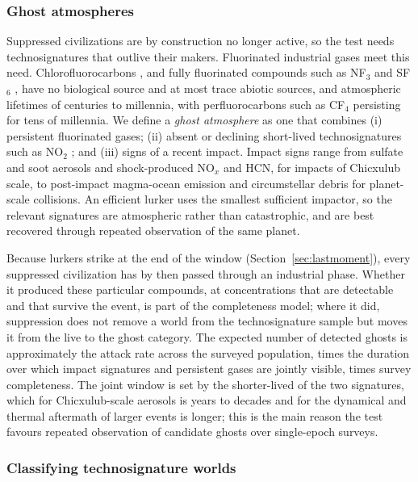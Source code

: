 \documentclass[preprint,12pt]{elsarticle}
\theoremstyle{definition}
\begin{document}
\subsubsection{Ghost atmospheres}

Suppressed civilizations are by construction no longer active, so the test needs technosignatures that outlive their makers. Fluorinated industrial gases meet this need. Chlorofluorocarbons \citep{Lin2014,HaqqMisra2022}, and fully fluorinated compounds such as NF$_3$ and SF$_6$ \citep{Seager2023}, have no biological source and at most trace abiotic sources, and atmospheric lifetimes of centuries to millennia, with perfluorocarbons such as CF$_4$ persisting for tens of millennia. We define a \emph{ghost atmosphere} as one that combines (i) persistent fluorinated gases; (ii) absent or declining short-lived technosignatures such as NO$_2$ \citep{Kopparapu2021}; and (iii) signs of a recent impact. Impact signs range from sulfate and soot aerosols and shock-produced NO$_x$ and HCN, for impacts of Chicxulub scale, to post-impact magma-ocean emission \citep{Lupu2014} and circumstellar debris \citep{Kenworthy2023} for planet-scale collisions. An efficient lurker uses the smallest sufficient impactor, so the relevant signatures are atmospheric rather than catastrophic, and are best recovered through repeated observation of the same planet.

Because lurkers strike at the end of the window (Section~\ref{sec:lastmoment}), every suppressed civilization has by then passed through an industrial phase. Whether it produced these particular compounds, at concentrations that are detectable and that survive the event, is part of the completeness model; where it did, suppression does not remove a world from the technosignature sample but moves it from the live to the ghost category. The expected number of detected ghosts is approximately the attack rate across the surveyed population, times the duration over which impact signatures and persistent gases are jointly visible, times survey completeness. The joint window is set by the shorter-lived of the two signatures, which for Chicxulub-scale aerosols is years to decades and for the dynamical and thermal aftermath of larger events is longer; this is the main reason the test favours repeated observation of candidate ghosts over single-epoch surveys.

\subsubsection{Classifying technosignature worlds}
\label{sec:bins}
\end{document}

